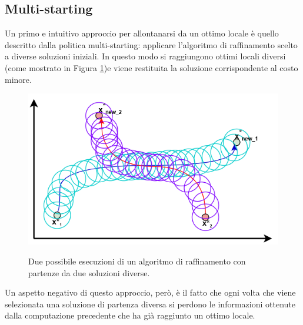\subsection{Multi-starting}
Un primo e intuitivo approccio per allontanarsi da un ottimo locale è quello descritto  dalla politica multi-starting: applicare l'algoritmo di raffinamento scelto a diverse soluzioni iniziali. In questo modo si raggiungono ottimi locali diversi (come mostrato in Figura \ref{multi_starting})e viene restituita la soluzione corrispondente al costo minore. 
\begin{figure}[h] 
\begin{center} 
  \includegraphics[scale=0.5]{Images/multistarting}\\ 
  \caption{\footnotesize{Due possibile esecuzioni di un algoritmo di raffinamento con partenze da due soluzioni diverse.}}
  \label{multi_starting}
\end{center}
\end{figure}
Un aspetto negativo di questo approccio, però, è il fatto che ogni volta che viene selezionata una soluzione di partenza diversa si perdono le informazioni ottenute dalla computazione precedente che ha già raggiunto un ottimo locale.
